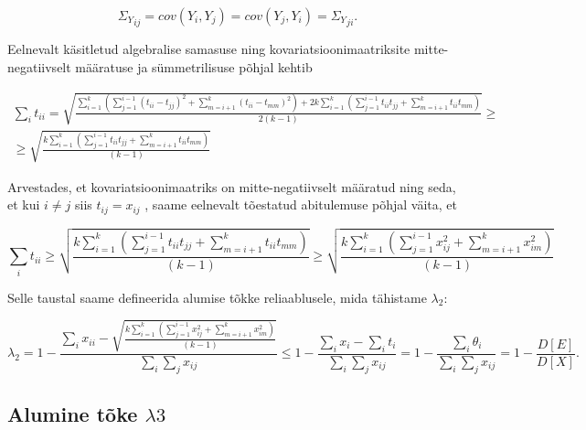 \documentclass[a4paper,12pt]{article}
\numberwithin{equation}{section}
\theoremstyle{definition}
\begin{document}
\begin{equation*}
{\Sigma_Y}_{ij} = cov(Y_i,Y_j) = cov(Y_j,Y_i) = {\Sigma_Y}_{ji} \text{.}
\end{equation*} 

Eelnevalt käsitletud algebralise samasuse ning kovariatsioonimaatriksite mitte-negatiivselt määratuse ja sümmetrilisuse põhjal kehtib

\begin{gather*}
\sum_i t_{ii} = \sqrt{\frac{\sum \limits_{i=1}^k  \left( \sum \limits_{j=1}^{i-1} (t_{ii} - t_{jj})^2 + \sum \limits_{m=i+1}^k ({t_{ii}} - {t_{mm}})^2 \right) +  2 k \sum \limits_{i=1}^k  \left( \sum \limits_{j=1}^{i-1} t_{ii} t_{jj} + \sum \limits_{m=i+1}^k {t_{ii}}{t_{mm}} \right)}{2 \left( k -1 \right)}} \geq \\ 
\geq  \sqrt{\frac{ k \sum \limits_{i=1}^k  \left( \sum \limits_{j=1}^{i-1} t_{ii} t_{jj} + \sum \limits_{m=i+1}^k {t_{ii}}{t_{mm}} \right)}{\left( k -1 \right)}}
\end{gather*}

Arvestades, et kovariatsioonimaatriks on mitte-negatiivselt määratud ning seda, et kui $i \neq j$ siis $t_{ij} = x_{ij}$ , saame eelnevalt tõestatud abitulemuse põhjal väita, et

\begin{equation*}
\sum_i t_{ii}  \geq \sqrt{\frac{ k \sum \limits_{i=1}^k  \left( \sum \limits_{j=1}^{i-1} t_{ii} t_{jj} + \sum \limits_{m=i+1}^k {t_{ii}}{t_{mm}} \right)}{\left( k -1 \right)}} \geq \sqrt{\frac{ k \sum \limits_{i=1}^k  \left( \sum \limits_{j=1}^{i-1} x_{ij}^2 + \sum \limits_{m=i+1}^k {x_{im}^2} \right)}{\left( k -1 \right)}}
\end{equation*} 

Selle taustal saame defineerida alumise tõkke reliaablusele, mida tähistame $\lambda_2$:

\begin{equation*}
\lambda_2 = 1 - \frac{\sum_i x_{ii} - \sqrt{\frac{ k \sum \limits_{i=1}^k  \left( \sum \limits_{j=1}^{i-1} x_{ij}^2 + \sum \limits_{m=i+1}^k {x_{im}^2} \right)}{\left( k -1 \right)}}}{\sum_i \sum_j x_{ij}} \leq 1 - \frac{\sum_i x_i - \sum_i t_i}{\sum_i \sum_j x_{ij}} =   1 - \frac{\sum_i \theta_i}{\sum_i \sum_j x_{ij}} =  1 - \frac{D \left[ E \right]}{D \left[ X \right]} \text{.}
\end{equation*}


\subsection{Alumine tõke $\lambda3$}
\end{document}
